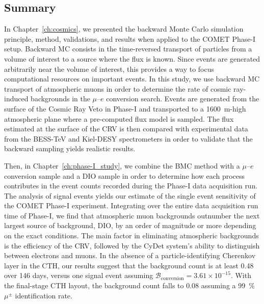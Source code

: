 \subsection{Summary}
In Chapter~\ref{ch:cosmics}, we presented the backward Monte Carlo simulation
principle, method, validations, and results when applied to the COMET Phase-I
setup. Backward MC consists in the time-reversed transport of particles from a
volume of interest to a source where the flux is known. Since events are
generated arbitrarily near the volume of interest, this provides a way to focus
computational resources on important events. In this study, we use backward MC
transport of atmospheric muons in order to determine the rate of cosmic
ray-induced backgrounds in the $\mu$--$e$ conversion search. Events are
generated from the surface of the Cosmic Ray Veto in Phase-I and transported to
a \SI{1600}{\metre}-high atmospheric plane where a pre-computed flux model is
sampled. The flux estimated at the surface of the CRV is then compared with
experimental data from the BESS-TeV and Kiel-DESY spectrometers in order to
validate that the backward sampling yields realistic results. 

Then, in Chapter~\ref{ch:phase-I_study}, we combine the BMC method with a
$\mu$--$e$ conversion sample and a DIO sample in order to determine how each
process contributes in the event counts recorded during the Phase-I data
acquisition run. The analysis of signal events yields our estimate of the single
event sensitivity of the COMET Phase-I experiment. Integrating over the entire
data acquisition run time of Phase-I, we find that atmospheric muon backgrounds
outnumber the next largest source of background, DIO, by an order of magnitude
or more depending on the exact conditions. The main factor in eliminating
atmospheric backgrounds is the efficiency of the CRV, followed by the CyDet
system's ability to distinguish between electrons and muons. In the absence of a
particle-identifying Cherenkov layer in the CTH, our results suggest that the
background count is at least 0.48 over 146 days, versus one signal event
assuming $\mathcal{B}_\mathrm{conversion} = 3.61 \times 10^{-15}$. With the
final-stage CTH layout, the background count falls to 0.08 assuming a
\SI{99}{\percent} $\mu^\pm$ identification rate.


